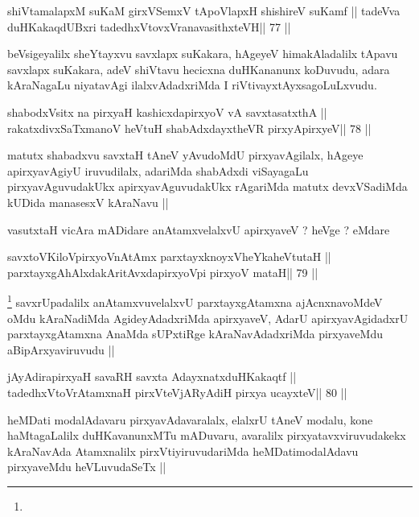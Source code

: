 \begin{shl}
shiVtamalapxM suKaM girxVSemxV tApoV\s lapxH shishireV suKamf ||
tadeVva duHKakaqdUBxri tadedhxVtovxVranavasithxteVH\hfill || 77 ||
\end{shl}

\begin{artha}
  beVsigeyalilx sheYtayxvu savxlapx suKakara, hAgeyeV himakAladalilx
  tApavu savxlapx suKakara, adeV shiVtavu hecicxna duHKananunx
  koDuvudu, adara kAraNagaLu niyatavAgi ilalxvAdadxriMda I
  riVtivayxtAyxsagoLuLxvudu.
\end{artha}

\begin{shl}
shabodxV\s sitx na pirxyaH kashicxdapirxyoV vA savxtasatxthA ||
rakatxdivxSaTxmanoV heVtuH shabAdxdayxtheVR pirxyApirxyeV\hfill || 78 ||
\end{shl}

\begin{artha}
matutx shabadxvu savxtaH tAneV yAvudoMdU pirxyavAgilalx, hAgeye
apirxyavAgiyU iruvudilalx, adariMda shabAdxdi viSayagaLu
pirxyavAguvudakUkx apirxyavAguvudakUkx rAgariMda matutx devxVSadiMda
kUDida manasesxV kAraNavu ||

vasutxtaH vicAra mADidare anAtamxvelalxvU apirxyaveV ? heVge ? eMdare
\end{artha}

\begin{shl}
savxtoV\s KiloV\s pirxyoV\s nAtAmx parxtayxknoyxVheYkaheVtutaH ||
parxtayxgAhAlxdakAritAvxdapirxyoV\s pi pirxyoV mataH\hfill || 79 ||
\end{shl}

\begin{artha}
\footnote[1]{}
savxrUpadalilx anAtamxvuvelalxvU parxtayxgAtamxna ajAcnxnavoMdeV oMdu
kAraNadiMda AgideyAdadxriMda apirxyaveV, AdarU apirxyavAgidadxrU
parxtayxgAtamxna AnaMda sUPxtiRge kAraNavAdadxriMda pirxyaveMdu
aBipArxyaviruvudu ||
\end{artha}

\begin{shl}
jAyAdirapirxyaH savaRH savxta AdayxnatxduHKakaqtf ||
tadedhxVtoVrAtamxnaH pirxVteVjARyAdiH pirxya ucayxteV\hfill || 80 ||
\end{shl}

\begin{artha}
heMDati modalAdavaru pirxyavAdavaralalx, elalxrU tAneV modalu, kone
haMtagaLalilx duHKavanunxMTu mADuvaru, avaralilx
pirxyatavxviruvudakekx kAraNavAda Atamxnalilx pirxVtiyiruvudariMda
heMDatimodalAdavu pirxyaveMdu heVLuvudaSeTx ||
\end{artha}

